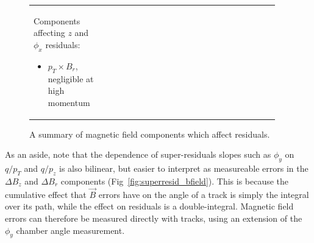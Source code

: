 \documentclass[12pt]{article}
\begin{document}
\begin{figure}
\begin{center}
\begin{tabular}{p{0.3\linewidth} c p{0.65\linewidth}}
\begin{minipage}{\linewidth}
\vspace{0.3 cm}
\noindent Components affecting $z$ and $\phi_x$ residuals:
\begin{itemize}
\item $p_T \times B_r$, negligible at high momentum
\end{itemize}

\end{minipage} \\
\end{tabular}
\end{center}
\caption{A summary of magnetic field components which affect residuals. \label{fig:bfield_components}}
\end{figure}

As an aside, note that the dependence of super-residuals slopes such
as $\phi_y$ on $q/p_T$ and $q/p_z$ is also bilinear, but easier to
interpret as measureable errors in the $\Delta B_z$ and $\Delta B_r$
components (Fig~\ref{fig:superresid_bfield}).  This is because the
cumulative effect that $\vec{B}$ errors have on the angle of a track
is simply the integral over its path, while the effect on residuals is
a double-integral.  Magnetic field errors can therefore be measured
directly with tracks, using an extension of the $\phi_y$ chamber angle
measurement.
\end{document}
